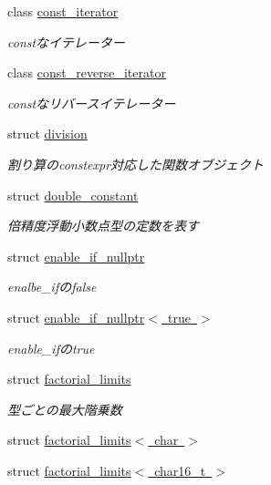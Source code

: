 \begin{DoxyCompactItemize}
class \mbox{\hyperlink{classsaki_1_1const__iterator}{const\+\_\+iterator}}
\begin{DoxyCompactList}\small\item\em constなイテレーター \end{DoxyCompactList}\item 
class \mbox{\hyperlink{classsaki_1_1const__reverse__iterator}{const\+\_\+reverse\+\_\+iterator}}
\begin{DoxyCompactList}\small\item\em constなリバースイテレーター \end{DoxyCompactList}\item 
struct \mbox{\hyperlink{structsaki_1_1division}{division}}
\begin{DoxyCompactList}\small\item\em 割り算のconstexpr対応した関数オブジェクト \end{DoxyCompactList}\item 
struct \mbox{\hyperlink{structsaki_1_1double__constant}{double\+\_\+constant}}
\begin{DoxyCompactList}\small\item\em 倍精度浮動小数点型の定数を表す \end{DoxyCompactList}\item 
struct \mbox{\hyperlink{structsaki_1_1enable__if__nullptr}{enable\+\_\+if\+\_\+nullptr}}
\begin{DoxyCompactList}\small\item\em enalbe\+\_\+ifのfalse \end{DoxyCompactList}\item 
struct \mbox{\hyperlink{structsaki_1_1enable__if__nullptr_3_01true_01_4}{enable\+\_\+if\+\_\+nullptr$<$ true $>$}}
\begin{DoxyCompactList}\small\item\em enable\+\_\+ifのtrue \end{DoxyCompactList}\item 
struct \mbox{\hyperlink{structsaki_1_1factorial__limits}{factorial\+\_\+limits}}
\begin{DoxyCompactList}\small\item\em 型ごとの最大階乗数 \end{DoxyCompactList}\item 
struct \mbox{\hyperlink{structsaki_1_1factorial__limits_3_01char_01_4}{factorial\+\_\+limits$<$ char $>$}}
\item 
struct \mbox{\hyperlink{structsaki_1_1factorial__limits_3_01char16__t_01_4}{factorial\+\_\+limits$<$ char16\+\_\+t $>$}}

\end{DoxyCompactItemize}
